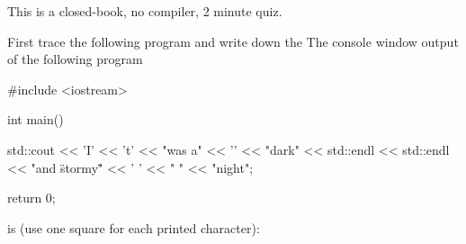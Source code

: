 


\usepackage[T1]{fontenc}  %
\usepackage{textcomp}     %
\usepackage{mathptmx}     %
                          
\renewcommand\AUTHOR{jdoe5@cougars.ccis.edu} %


\topmattertwo

This is a closed-book, no compiler, 2 minute quiz.

First trace the following program and write down the
The console window output of the following program
\begin{console}[fontsize=\small]
#include <iostream>

int main()
{
    std::cout << 'I' << 't' << "was a" << '\n' << "dark\n" 
              << std::endl << std::endl << "and  \"stormy\"" << ' ' << " " 
              << "night\n";
    
    return 0;
}
\end{console} 
is (use one square for each printed character):

